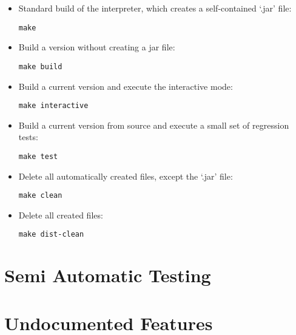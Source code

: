 \begin{itemize}
	\item Standard build of the interpreter, which creates a self-contained `.jar' file:
\begin{lstlisting}[frame=none,numbers=none]
make
\end{lstlisting}

	\item Build a version without creating a jar file:

\begin{lstlisting}[frame=none,numbers=none]
make build
\end{lstlisting}

	\item Build a current version and execute the interactive mode:

\begin{lstlisting}[frame=none,numbers=none]
make interactive
\end{lstlisting}

	\item Build a current version from source and execute a small set of regression tests:

\begin{lstlisting}[frame=none,numbers=none]
make test
\end{lstlisting}

	\item Delete all automatically created files, except the `.jar' file:

\begin{lstlisting}[frame=none,numbers=none]
make clean
\end{lstlisting}

	\item Delete all created files:

\begin{lstlisting}[frame=none,numbers=none]
make dist-clean
\end{lstlisting}

\end{itemize}

\section{Semi Automatic Testing}


\section{Undocumented Features}


